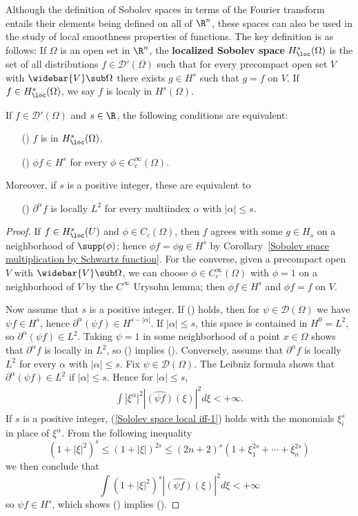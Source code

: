 Although the definition of Sobolev spaces in terms of the Fourier transform entails their elements being defined on all of $\R^n$, these spaces can also be used in the study of local smoothness properties of functions. The key definition is as follows: If $\Omega$ is an open set in $\R^n$, the \textbf{localized Sobolev space} $H^{s}_{\loc}(\Omega)$ is the set of all distributions $f\in\mathscr{D}'(\Omega)$ such that for every precompact open set $V$ with $\widebar{V}\sub\Omega$ there exists $g\in H^s$ such that $g=f$ on $V$. If $f\in H^{s}_{\loc}(\Omega)$, we say $f$ is localy in $H^s(\Omega)$.
\begin{proposition}\label{Sololev space local iff}
If $f\in\mathscr{D}'(\Omega)$ and $s\in\R$, the following conditions are equivalent:
\begin{itemize}
\item[(\rmnum{1})] $f$ is in $H^s_{\loc}(\Omega)$.
\item[(\rmnum{2})] $\phi f\in H^s$ for every $\phi\in C_c^\infty(\Omega)$.
\end{itemize}
Moreover, if $s$ is a positive integer, these are equivalent to
\begin{itemize}
\item[(\rmnum{3})] $\partial^\alpha f$ is locally $L^2$ for every multiindex $\alpha$ with $|\alpha|\leq s$.
\end{itemize}
\end{proposition}
\begin{proof}
If $f\in H^s_{\loc}(U)$ and $\phi\in C_c(\Omega)$, then $f$ agrees with some $g\in H_s$ on a neighborhood of $\supp(\phi)$; hence $\phi f=\phi g\in H^s$ by Corollary~\ref{Sobolev space multiplication by Schwartz function}. For the converse, given a precompact open $V$ with $\widebar{V}\sub\Omega$, we can choose $\phi\in C_c^\infty(\Omega)$ with $\phi=1$ on a neighborhood of $V$ by the $C^\infty$ Urysohn lemma; then $\phi f\in H^s$ and $\phi f=f$ on $V$.\par
Now assume that $s$ is a positive integer. If () holds, then for $\psi\in\mathscr{D}(\Omega)$ we have $\psi f\in H^s$, hence $\partial^\alpha(\psi f)\in H^{s-|\alpha|}$. If $|\alpha|\leq s$, this space is contained in $H^0=L^2$, so $\partial^\alpha(\psi f)\in L^2$. Taking $\psi=1$ in some neighborhood of a point $x\in\Omega$ shows that $\partial^\alpha f$ is locally in $L^2$, so () implies (). Conversely, assume that $\partial^\alpha f$ is locally $L^2$ for every $\alpha$ with $|\alpha|\leq s$. Fix $\psi\in\mathscr{D}(\Omega)$. The Leibniz formula shows that $\partial^\alpha(\psi f)\in L^2$ if $|\alpha|\leq s$. Hence for $|\alpha|\leq s$,
\begin{align}\label{Sololev space local iff-1}
\int|\xi^\alpha|^2|\widehat{(\psi f)}(\xi)|^2d\xi<+\infty.
\end{align}
If $s$ is a positive integer, (\ref{Sololev space local iff-1}) holds with the monomials $\xi_i^s$ in place of $\xi^\alpha$. From the following inequality
\[(1+|\xi|^2)^s\leq(1+|\xi|)^{2s}\leq (2n+2)^s(1+\xi_1^{2s}+\cdots+\xi_n^{2s})\]
we then conclude that
\[\int(1+|\xi|^2)^s|\widehat{(\psi f)}(\xi)|^2d\xi<+\infty\]
so $\psi f\in H^s$, which shows () implies ().
\end{proof}
